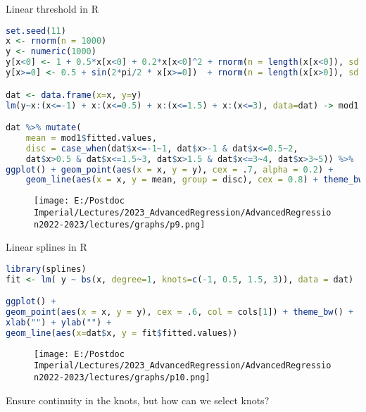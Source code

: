 \documentclass{beamer}
\begin{document}
\begin{frame}[fragile]{Linear threshold in R}
	\vspace{-0.2cm}
\begin{lstlisting}[language=R, basicstyle=\tiny]
set.seed(11)
x <- rnorm(n = 1000)
y <- numeric(1000)
y[x<0] <- 1 + 0.5*x[x<0] + 0.2*x[x<0]^2 + rnorm(n = length(x[x<0]), sd = 0.2)
y[x>=0] <- 0.5 + sin(2*pi/2 * x[x>=0])  + rnorm(n = length(x[x>0]), sd = 0.3)

dat <- data.frame(x=x, y=y)
lm(y~x:(x<=-1) + x:(x<=0.5) + x:(x<=1.5) + x:(x<=3), data=dat) -> mod1

dat %>% mutate(
	mean = mod1$fitted.values, 
	disc = case_when(dat$x<=-1~1, dat$x>-1 & dat$x<=0.5~2, 
	dat$x>0.5 & dat$x<=1.5~3, dat$x>1.5 & dat$x<=3~4, dat$x>3~5)) %>% 
ggplot() + geom_point(aes(x = x, y = y), cex = .7, alpha = 0.2) + 
	geom_line(aes(x = x, y = mean, group = disc), cex = 0.8) + theme_bw() 
\end{lstlisting}
	\begin{figure}
	\centering	
\texttt{[image: E:/Postdoc Imperial/Lectures/2023\_AdvancedRegression/AdvancedRegression2022-2023/lectures/graphs/p9.png]}	
\end{figure}

\end{frame}

\begin{frame}[fragile]{Linear splines in R}
	\begin{lstlisting}[language=R, basicstyle=\tiny]
library(splines)
fit <- lm( y ~ bs(x, degree=1, knots=c(-1, 0.5, 1.5, 3)), data = dat)

ggplot() + 
geom_point(aes(x = x, y = y), cex = .6, col = cols[1]) + theme_bw() + 
xlab("") + ylab("") +
geom_line(aes(x=dat$x, y = fit$fitted.values))
	\end{lstlisting}
	\begin{figure}
		\centering	
		\texttt{[image: E:/Postdoc Imperial/Lectures/2023\_AdvancedRegression/AdvancedRegression2022-2023/lectures/graphs/p10.png]}	
	\end{figure}
	Ensure continuity in the knots, but how can we select knots?
\end{frame}
\end{document}

